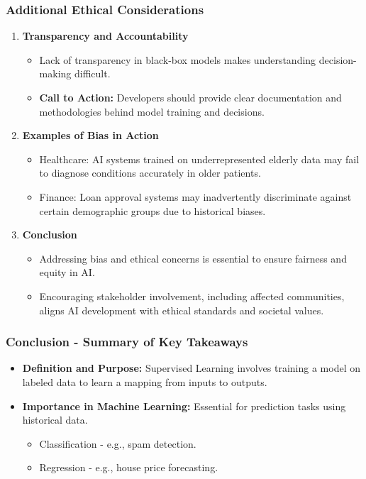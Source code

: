 \documentclass[aspectratio=169]{beamer}
\begin{document}
\begin{frame}[fragile]
    \frametitle{Additional Ethical Considerations}
    \begin{enumerate}
        \item \textbf{Transparency and Accountability}
        \begin{itemize}
            \item Lack of transparency in black-box models makes understanding decision-making difficult.
            \item \textbf{Call to Action:} Developers should provide clear documentation and methodologies behind model training and decisions.
        \end{itemize}

        \item \textbf{Examples of Bias in Action}
        \begin{itemize}
            \item Healthcare: AI systems trained on underrepresented elderly data may fail to diagnose conditions accurately in older patients.
            \item Finance: Loan approval systems may inadvertently discriminate against certain demographic groups due to historical biases.
        \end{itemize}

        \item \textbf{Conclusion}
        \begin{itemize}
            \item Addressing bias and ethical concerns is essential to ensure fairness and equity in AI.
            \item Encouraging stakeholder involvement, including affected communities, aligns AI development with ethical standards and societal values.
        \end{itemize}
    \end{enumerate}
\end{frame}

\begin{frame}[fragile]
    \frametitle{Conclusion - Summary of Key Takeaways}
    
    \begin{itemize}
        \item \textbf{Definition and Purpose:} 
        Supervised Learning involves training a model on labeled data to learn a mapping from inputs to outputs.
        
        \item \textbf{Importance in Machine Learning:}
        Essential for prediction tasks using historical data.
        \begin{itemize}
            \item Classification - e.g., spam detection.
            \item Regression - e.g., house price forecasting.
        \end{itemize}
    \end{itemize}
\end{frame}
\end{document}
